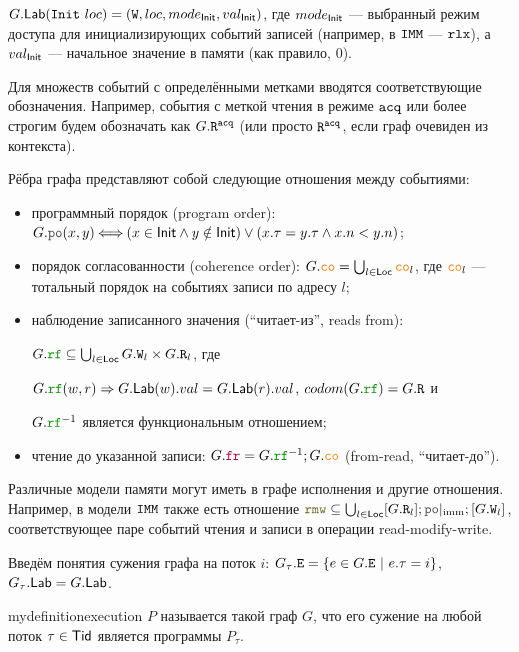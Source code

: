 $G.\mathsf{Lab}(\mathtt{Init}\ loc) = ({\mathtt{W}}, loc, mode_{\mathsf{Init}}, val_{\mathsf{Init}})$, где $mode_{\mathsf{Init}}$ --- выбранный режим доступа для инициализирующих событий записей (например, в $\mathtt{IMM}$ --- $\mathtt{rlx}$), а $val_{\mathsf{Init}}$ --- начальное значение в памяти (как правило, 0).

Для множеств событий с определёнными метками вводятся соответствующие обозначения. Например, события с меткой чтения в режиме ${\mathtt{acq}}$ или более строгим будем обозначать как $G.{\mathtt{R}}^{{\mathtt{acq}}}$ (или просто ${\mathtt{R}}^{{\mathtt{acq}}}$, если граф очевиден из контекста).

Рёбра графа представляют собой следующие отношения между событиями:
\begin{itemize}
\item программный порядок (program order): $G.\lPO(x, y)\!\! \iff \!\! (x\in \Init \land y\notin \Init) \lor (x.\tau = y.\tau \land x.n<y.n)$;
\item порядок согласованности (coherence order): $G.\lCO = \bigcup_{l\in \Loc} \lCO_l$, где $\lCO_l$ --- тотальный порядок на событиях записи по адресу $l$;
\item наблюдение записанного значения (``читает-из'', reads from):

  $G.\lRF \subseteq \bigcup_{l\in \Loc} G.\lW_l \times G.\lR_l$, где

  $G.\lRF(w, r)\implies G.\Lab(w).val = G.\Lab(r).val$, $codom(G.\lRF) = G.\lR$ и

  $G.\lRF^{-1}$ является функциональным отношением;
\item чтение до указанной записи: $G.\lFR = G.\lRF^{-1}; G.\lCO$ (from-read, ``читает-\allowbreak до'').
\end{itemize}  

Различные модели памяти могут иметь в графе исполнения и другие отношения. Например, в модели $\mathtt{IMM}$ также есть отношение $\lRMW \subseteq \bigcup_{l\in \Loc}[G.\lR_l];\imm\lPO;[G.\lW_l]$, соответствующее паре событий чтения и записи в операции read-modify-write. 

Введём понятия сужения графа на поток $i$: $G_\tau.{\mathtt{E}} = \{e\in G.{\mathtt{E}}\ |\ e.\tau = i\}$, $G_\tau.\mathsf{Lab} = G.\mathsf{Lab}$.

\begin{restatable}{mydefinition}{execution}
 $P$ называется такой граф $G$, что его сужение на любой поток $\tau\in \mathsf{Tid}$ является  программы $P_\tau$.
\end{restatable}

